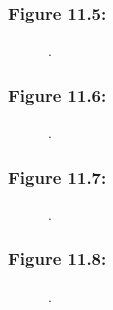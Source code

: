 \documentclass[t]{beamer}\usepackage[]{graphicx}\usepackage[]{color}
\begin{document}
\begin{frame}[label=Figure_11_5]
\frametitle{Figure 11.5: }
\begin{figure}[t]
\begin{minipage}[b]{\textwidth}
\centering

\caption{.}
\end{minipage}
\end{figure}
\end{frame}


\begin{frame}[label=Figure_11_6]
\frametitle{Figure 11.6: }
\begin{figure}[t]
\begin{minipage}[b]{\textwidth}
\centering

\caption{.}
\end{minipage}
\end{figure}
\end{frame}


\begin{frame}[label=Figure_11_7]
\frametitle{Figure 11.7: }
\begin{figure}[t]
\begin{minipage}[b]{\textwidth}
\centering

\caption{.}
\end{minipage}
\end{figure}
\end{frame}


\begin{frame}[label=Figure_11_8]
\frametitle{Figure 11.8: }
\begin{figure}[t]
\begin{minipage}[b]{\textwidth}
\centering

\caption{.}
\end{minipage}
\end{figure}
\end{frame}
\end{document}
